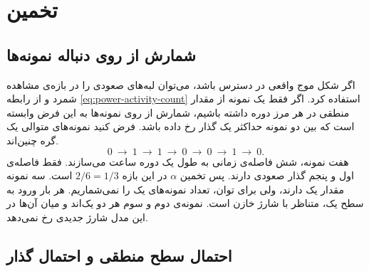 \section{تخمین }
\label{sec:power-activity}

\subsection{شمارش از روی دنباله نمونه‌ها}
\label{sec:power-activity-trace}

اگر شکل موج واقعی در دسترس باشد، می‌توان لبه‌های صعودی را در بازه‌ی
مشاهده شمرد و از رابطه \eqref{eq:power-activity-count} استفاده کرد.
اگر فقط یک نمونه از مقدار منطقی در هر مرز دوره داشته باشیم، شمارش
از روی نمونه‌ها به این فرض وابسته است که بین دو نمونه حداکثر یک
گذار رخ داده باشد. فرض کنید نمونه‌های متوالی یک گره چنین‌اند.
\[
  0\ \longrightarrow\ 1\ \longrightarrow\ 1\ \longrightarrow\ 0\
  \longrightarrow\ 0\ \longrightarrow\ 1\ \longrightarrow\ 0 .
\]
هفت نمونه، شش فاصله‌ی زمانی به طول یک دوره ساعت می‌سازند. فقط
فاصله‌ی اول و پنجم گذار صعودی دارند. پس تخمین \(\alpha\) در این
بازه \(2/6=1/3\) است. سه نمونه مقدار یک دارند، ولی برای توان،
تعداد نمونه‌های یک را نمی‌شماریم. هر بار ورود به سطح یک، متناظر با
شارژ خازن است. نمونه‌ی دوم و سوم هر دو یک‌اند و میان آن‌ها در این
مدل شارژ جدیدی رخ نمی‌دهد.

\subsection{احتمال سطح منطقی و احتمال گذار}
\label{sec:power-switching-probability}

